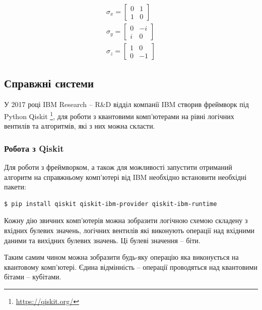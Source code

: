 \documentclass{article}
\begin{document}
\begin{align}
    \label{sigmax}
    \sigma_x =
    \begin{bmatrix}
        0 & 1\\
        1 & 0
    \end{bmatrix} \\ 
    \label{sigmay}
    \sigma_y =
    \begin{bmatrix}
        0 & -i\\
        i & 0
    \end{bmatrix} \\
    \label{sigmaz}
    \sigma_z =
    \begin{bmatrix}
        1 & 0\\
        0 & -1
    \end{bmatrix}
\end{align}

\subsection{Справжні системи}

У 2017 році IBM Research -- R\&D відділ компанії IBM створив фреймворк під Python Qiskit \footnote{\url{https://qiskit.org/}}, для роботи з квантовими комп'ютерами на рівні логічних вентилів та алгоритмів, які з них можна скласти.

\subsubsection{Робота з Qiskit}

Для роботи з фреймворком, а також для можливості запустити отриманий алгоритм на справжньому комп'ютері від IBM необхідно встановити необхідні пакети:
\begin{verbatim}
$ pip install qiskit qiskit-ibm-provider qiskit-ibm-runtime
\end{verbatim}

Кожну дію звичних комп'ютерів можна зобразити логічною схемою складену з вхідних булевих значень, логічних вентилів які виконують операції над вхідними даними та вихідних булевих значень. 
Ці булеві значення -- біти.

Таким самим чином можна зобразити будь-яку операцію яка виконується на квантовому комп'ютері. 
Єдина відмінність -- операції проводяться над квантовими бітами -- кубітами.
\end{document}
